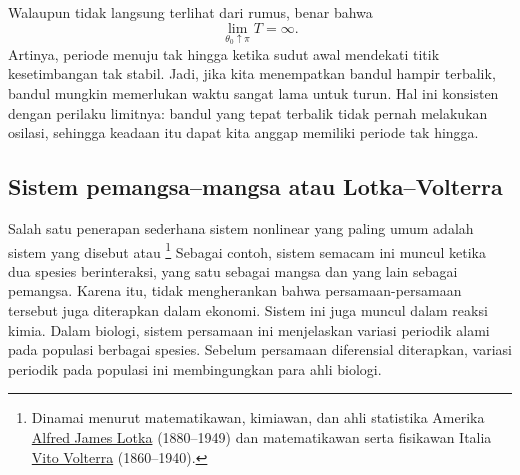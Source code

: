 \begin{myfig}
\capstart
\caption{Plot $T$ dan $T_{\text{linear}}$ dengan $\frac{g}{L} =
1$ (kiri), serta plot galat relatif
$\frac{T-T_{\text{linear}}}{T}$ (kanan), untuk $\theta_0$ antara 0 dan
$\nicefrac{\pi}{2}$. \label{fig:TvsT0}}
\end{myfig}

Walaupun tidak langsung terlihat dari rumus, benar bahwa
\begin{equation*}
\lim_{\theta_0 \uparrow \pi} T = \infty .
\end{equation*}
Artinya, periode menuju tak hingga ketika sudut awal mendekati titik
kesetimbangan tak stabil. Jadi, jika kita menempatkan bandul hampir terbalik,
bandul mungkin memerlukan waktu sangat lama untuk turun. Hal ini konsisten
dengan perilaku limitnya: bandul yang tepat terbalik tidak pernah melakukan
osilasi, sehingga keadaan itu dapat kita anggap memiliki periode tak hingga.

\subsection{Sistem pemangsa--mangsa atau Lotka--Volterra}

Salah satu penerapan sederhana sistem nonlinear yang paling umum adalah sistem
yang disebut \emph{} atau
\emph{}%
\footnote{Dinamai menurut matematikawan, kimiawan, dan ahli statistika Amerika
\href{https://en.wikipedia.org/wiki/Alfred_J._Lotka}{Alfred James Lotka}
(1880--1949) dan matematikawan serta fisikawan Italia
\href{https://en.wikipedia.org/wiki/Vito_Volterra}{Vito Volterra}
(1860--1940).}
Sebagai contoh, sistem semacam ini muncul ketika dua spesies berinteraksi,
yang satu sebagai mangsa dan yang lain sebagai pemangsa. Karena itu, tidak
mengherankan bahwa persamaan-persamaan tersebut juga diterapkan dalam
ekonomi. Sistem ini juga muncul dalam reaksi kimia.
Dalam biologi, sistem persamaan ini menjelaskan variasi periodik alami pada
populasi berbagai spesies. Sebelum persamaan diferensial diterapkan, variasi
periodik pada populasi ini membingungkan para ahli biologi.

